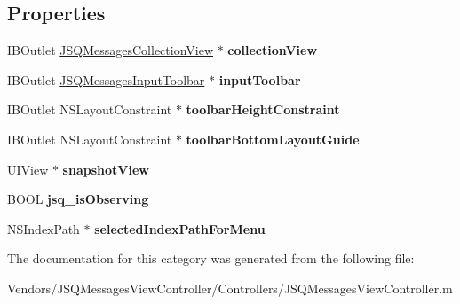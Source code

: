 \subsection*{Properties}
\begin{DoxyCompactItemize}
\item 
\hypertarget{category_j_s_q_messages_view_controller_07_08_a0d960565f9af591547c6b4568ba55aee}{}I\+B\+Outlet \hyperlink{interface_j_s_q_messages_collection_view}{J\+S\+Q\+Messages\+Collection\+View} $\ast$ {\bfseries collection\+View}\label{category_j_s_q_messages_view_controller_07_08_a0d960565f9af591547c6b4568ba55aee}

\item 
\hypertarget{category_j_s_q_messages_view_controller_07_08_ac3351bb8a963e39c90ef84982947f36c}{}I\+B\+Outlet \hyperlink{interface_j_s_q_messages_input_toolbar}{J\+S\+Q\+Messages\+Input\+Toolbar} $\ast$ {\bfseries input\+Toolbar}\label{category_j_s_q_messages_view_controller_07_08_ac3351bb8a963e39c90ef84982947f36c}

\item 
\hypertarget{category_j_s_q_messages_view_controller_07_08_afe92793d8d30a6892c41acfe4334dc44}{}I\+B\+Outlet N\+S\+Layout\+Constraint $\ast$ {\bfseries toolbar\+Height\+Constraint}\label{category_j_s_q_messages_view_controller_07_08_afe92793d8d30a6892c41acfe4334dc44}

\item 
\hypertarget{category_j_s_q_messages_view_controller_07_08_af62f62d55088cde60170b2cf8db6cdde}{}I\+B\+Outlet N\+S\+Layout\+Constraint $\ast$ {\bfseries toolbar\+Bottom\+Layout\+Guide}\label{category_j_s_q_messages_view_controller_07_08_af62f62d55088cde60170b2cf8db6cdde}

\item 
\hypertarget{category_j_s_q_messages_view_controller_07_08_ac55e674de6be3c645ea9b17f9d3dd72e}{}U\+I\+View $\ast$ {\bfseries snapshot\+View}\label{category_j_s_q_messages_view_controller_07_08_ac55e674de6be3c645ea9b17f9d3dd72e}

\item 
\hypertarget{category_j_s_q_messages_view_controller_07_08_a64d233ac9e993035e46931d356fdd200}{}B\+O\+O\+L {\bfseries jsq\+\_\+is\+Observing}\label{category_j_s_q_messages_view_controller_07_08_a64d233ac9e993035e46931d356fdd200}

\item 
\hypertarget{category_j_s_q_messages_view_controller_07_08_aa4546d80364f81bd73ec346f5875c5c5}{}N\+S\+Index\+Path $\ast$ {\bfseries selected\+Index\+Path\+For\+Menu}\label{category_j_s_q_messages_view_controller_07_08_aa4546d80364f81bd73ec346f5875c5c5}

\end{DoxyCompactItemize}


The documentation for this category was generated from the following file\+:\begin{DoxyCompactItemize}
\item 
Vendors/\+J\+S\+Q\+Messages\+View\+Controller/\+Controllers/J\+S\+Q\+Messages\+View\+Controller.\+m\end{DoxyCompactItemize}
